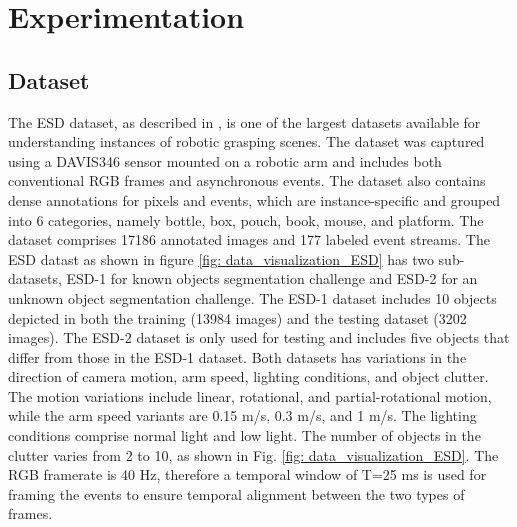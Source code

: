 \documentclass[lettersize,journal]{IEEEtran}
\begin{document}
\section{{Experimentation}}
\label{section: Experimental Results}

\subsection{\textbf{Dataset}}



The ESD dataset, as described in \cite{Huang2023AEnvironment}, is one of the largest datasets available for understanding instances of robotic grasping scenes. The dataset was captured using a DAVIS346 sensor mounted on a robotic arm and includes both conventional RGB frames and asynchronous events. The dataset also contains dense annotations for pixels and events, which are instance-specific and grouped into 6 categories, namely bottle, box, pouch, book, mouse, and platform. The dataset comprises 17186 annotated images and 177 labeled event streams. The ESD datast as shown in figure \ref{fig: data_visualization_ESD} has two sub-datasets, ESD-1 for known objects segmentation challenge and ESD-2 for an unknown object segmentation challenge. The ESD-1 dataset includes 10 objects depicted in both the training (13984 images) and the testing dataset (3202 images).  The ESD-2 dataset is only used for testing and includes five objects that differ from those in the ESD-1 dataset. Both datasets has variations in the direction of camera motion, arm speed, lighting conditions, and object clutter. The motion variations include linear, rotational, and partial-rotational motion, while the arm speed variants are 0.15 m/s, 0.3 m/s, and 1 m/s. The lighting conditions comprise normal light and low light. The number of objects in the clutter varies from 2 to 10, as shown in Fig. \ref{fig: data_visualization_ESD}. The RGB framerate is 40 Hz, therefore a temporal window of T=25 ms is used for framing the events to ensure temporal alignment between the two types of frames. 
\end{document}
